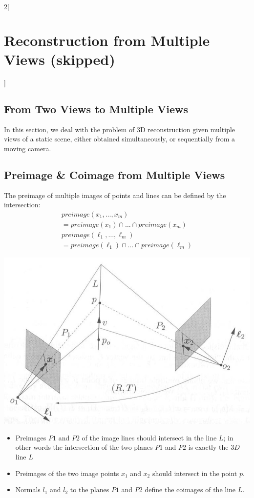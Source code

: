 \documentclass[oneside,fontsize=11pt,paper=a4]{scrartcl}
\newenvironment{myfigure}
  {\par\medskip\noindent\minipage{\linewidth}}
  {\endminipage\par\medskip}
\begin{document}
\begin{multicols}{2}[\section{Reconstruction from Multiple Views (skipped)}]
\subsection{From Two Views to Multiple Views}
In this section, we deal with the problem of 3D reconstruction given multiple views of a static scene, either obtained simultaneously, or sequentially from a moving camera.
\subsection{Preimage \& Coimage from Multiple Views}
The preimage of multiple images of points and lines can be defined by the intersection:
\begin{equation*}
\begin{split}
    preimage(x_1, \dots, x_m)\\ = preimage(x_1) \cap \dots \cap preimage(x_m)\\
    preimage(\ell_1, \dots, \ell_m)\\ = preimage(\ell_1) \cap \dots \cap preimage(\ell_m)
\end{split}
\end{equation*}
\begin{myfigure}
 \centering
 \includegraphics[width=0.8\linewidth]{Images/Preimage.jpg}
\end{myfigure}
\begin{itemize}
    \item Preimages $P1$ and $P2$ of the image lines should intersect in the line $L$; in other words the intersection of the two planes $P1$ and $P2$ is exactly the $3D$ line $L$
    \item Preimages of the two image points $x_1$ and $x_2$ should intersect in the point $p$.
    \item Normals $l_1$ and $l_2$ to the planes $P1$ and $P2$ define the coimages of the line $L$.
\end{itemize}

\end{multicols}
\end{document}
